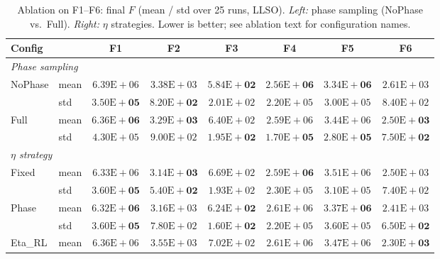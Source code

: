 \documentclass[conference]{IEEEtran}
\begin{document}
\begin{table}[!t]
\centering
\scriptsize
\caption{Ablation on F1--F6: final $F$ (mean / std over 25 runs, LLSO). \emph{Left:} phase sampling (NoPhase vs.\ Full). \emph{Right:} $\eta$ strategies. Lower is better; see ablation text for configuration names.}
\label{tab:phase_eta}
\begin{tabular}{llcccccc}
\toprule
\textbf{Config} & & F1 & F2 & F3 & F4 & F5 & F6 \\
\midrule
\multicolumn{8}{l}{\textit{Phase sampling}} \\
NoPhase & mean & $6.39\mathrm{E}\!+\!06$ & $3.38\mathrm{E}\!+\!03$ & $\mathbf{5.84\mathrm{E}\!+\!02}$ & $\mathbf{2.56\mathrm{E}\!+\!06}$ & $\mathbf{3.34\mathrm{E}\!+\!06}$ & $2.61\mathrm{E}\!+\!03$ \\
 & std & $\mathbf{3.50\mathrm{E}\!+\!05}$ & $\mathbf{8.20\mathrm{E}\!+\!02}$ & $2.01\mathrm{E}\!+\!02$ & $2.20\mathrm{E}\!+\!05$ & $3.00\mathrm{E}\!+\!05$ & $8.40\mathrm{E}\!+\!02$ \\
Full & mean & $\mathbf{6.36\mathrm{E}\!+\!06}$ & $\mathbf{3.29\mathrm{E}\!+\!03}$ & $6.40\mathrm{E}\!+\!02$ & $2.59\mathrm{E}\!+\!06$ & $3.44\mathrm{E}\!+\!06$ & $\mathbf{2.50\mathrm{E}\!+\!03}$ \\
 & std & $4.30\mathrm{E}\!+\!05$ & $9.00\mathrm{E}\!+\!02$ & $\mathbf{1.95\mathrm{E}\!+\!02}$ & $\mathbf{1.70\mathrm{E}\!+\!05}$ & $\mathbf{2.80\mathrm{E}\!+\!05}$ & $\mathbf{7.50\mathrm{E}\!+\!02}$ \\
\midrule
\multicolumn{8}{l}{\textit{$\eta$ strategy}} \\
Fixed & mean & $6.33\mathrm{E}\!+\!06$ & $\mathbf{3.14\mathrm{E}\!+\!03}$ & $6.69\mathrm{E}\!+\!02$ & $\mathbf{2.59\mathrm{E}\!+\!06}$ & $3.51\mathrm{E}\!+\!06$ & $2.50\mathrm{E}\!+\!03$ \\
 & std & $\mathbf{3.60\mathrm{E}\!+\!05}$ & $\mathbf{5.40\mathrm{E}\!+\!02}$ & $1.93\mathrm{E}\!+\!02$ & $2.30\mathrm{E}\!+\!05$ & $3.10\mathrm{E}\!+\!05$ & $7.40\mathrm{E}\!+\!02$ \\
Phase & mean & $\mathbf{6.32\mathrm{E}\!+\!06}$ & $3.16\mathrm{E}\!+\!03$ & $\mathbf{6.24\mathrm{E}\!+\!02}$ & $2.61\mathrm{E}\!+\!06$ & $\mathbf{3.37\mathrm{E}\!+\!06}$ & $2.41\mathrm{E}\!+\!03$ \\
 & std & $\mathbf{3.60\mathrm{E}\!+\!05}$ & $7.80\mathrm{E}\!+\!02$ & $\mathbf{1.60\mathrm{E}\!+\!02}$ & $2.20\mathrm{E}\!+\!05$ & $3.60\mathrm{E}\!+\!05$ & $\mathbf{6.50\mathrm{E}\!+\!02}$ \\
Eta\_RL & mean & $6.36\mathrm{E}\!+\!06$ & $3.55\mathrm{E}\!+\!03$ & $7.02\mathrm{E}\!+\!02$ & $2.61\mathrm{E}\!+\!06$ & $3.47\mathrm{E}\!+\!06$ & $\mathbf{2.30\mathrm{E}\!+\!03}$ \\

\end{tabular}
\end{table}
\end{document}
